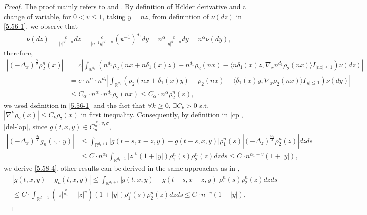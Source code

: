 \documentclass[11pt,reqno]{amsart}
\numberwithin{equation}{section}
\begin{document}
\begin{proof}
The proof mainly refers to \cite[Lemma 4.1]{RX} and \cite[Lemma 5.1]{KY}. By definition of  H\"{o}lder derivative and a change of variable, for $0<v\leq1$,
 taking $y=nz$, from definintion of $\nu(dz)$ in \eqref{5.56-1}, we observe that 
\begin{align*} \nu(dz)=\frac{c}{|z|^{d_{1}+\alpha}}dz=\frac{c}{|n^{-1}y|^{d_{1}+\alpha}}(n^{-1})^{d_{1}}dy=n^{\alpha}\frac{c}{|y|^{d_{1}+\alpha}}dy=n^{\alpha}\nu(dy),	
	\end{align*}
therefore,
\begin{align}
\left|(-\Delta_{x})^{\frac{\alpha}{2}}\rho_{2}^{n}(x)\right|& =c\left| \int_{\mathbb{R}^{d_{1}}}\left( n^{d_{1}}\rho_{2}(nx+n\delta_{1}(x)z)-n^{d_{1}}\rho_{2}(nx)-\langle n\delta_{1}(x)z,\nabla_{x}n^{d_{1}}\rho_{2}(nx)\rangle I_{|nz|\leq1}\right) \nu(dz)\right|\nonumber \\
&=c\cdot n^{\alpha}\cdot n^{d_{1}}\left| \int_{\mathbb{R}^{d_{1}}}\left( \rho_{2}(nx+\delta_{1}(x)y)-\rho_{2}(nx)-\langle \delta_{1}(x)y,\nabla_{x}\rho_{2}(nx)\rangle I_{|y|\leq1}\right) \nu(dy)\right|\nonumber\\
& \leq C_{\alpha}\cdot n^{\alpha}\cdot n^{d_{1}}\rho_{2}(nx)\leq C_{\alpha}\cdot n^{\alpha}\rho_{2}^{n}(x),\label{del-lap}
\end{align}
we used definition in \eqref{5.56-1} and the fact that $\forall k\geq 0$, $\exists C_{k}>0$ s.t. $|\nabla^{k}\rho_{2}(x)|\leq C_{k}\rho_{2}(x)$ in first inequality. Consequently, by definition in \eqref{cp}, \eqref{del-lap}, since $g(t,x,y)\in C_{p}^{\frac{v}{\alpha_{1}}, v,\sigma }$, 
\begin{align*}
|(-\Delta_{x})^{\frac{\alpha_{1}}{2}}g_{n}(\cdot,\cdot,y)|&\leq \int_{\mathbb{R}^{ d_{1}+1}}	|g(t-s,x-z,y)-g(t-s,x,y)|\rho_{1}^{n}(s)|(-\Delta_{z})^{\frac{\alpha_{1}}{2}}\rho_{2}^{n}(z)|dzds\\
&\leq C\cdot n^{\alpha_{1}}\int_{\mathbb{R}^{ d_{1}+1}}	|z|^{v}(1+|y|)\rho_{1}^{n}(s)\rho_{2}^{n}(z)dzds\leq C\cdot n^{\alpha_{1}-v}(1+|y|),
	\end{align*}
we derive \eqref{5.58-4}, other results can be derived in the same approaches as in \cite[Lemma 5.1]{KY},
\begin{align*}
	&|g(t,x,y)-g_{n}(t,x,y)|\leq \int_{\mathbb{R}^{ d_{1}+1}}	|g(t,x,y)-g(t-s,x-z,y)|\rho_{1}^{n}(s)\rho_{2}^{n}(z)dzds\\
	&\leq C\cdot\int_{\mathbb{R}^{ d_{1}+1}}	(|s|^{\frac{v}{\alpha_{1}}}+|z|^{v})(1+|y|)\rho_{1}^{n}(s)\rho_{2}^{n}(z)dzds\leq C\cdot n^{-v}(1+|y|),
\end{align*}

\end{proof}
\end{document}
